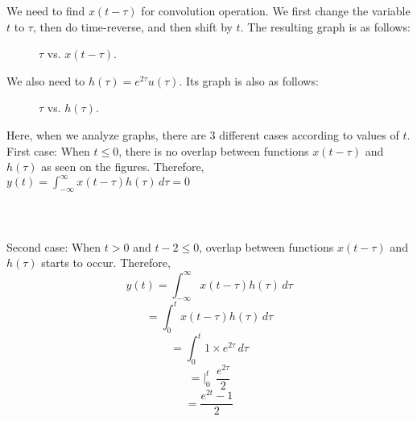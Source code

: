 \documentclass[10pt,a4paper, margin=1in]{article}
\begin{document}
\begin{enumerate}
\begin{enumerate}
    We need to find $x(t-\tau)$ for convolution operation. We first change the variable $t$ to $\tau$, then do time-reverse, and then shift by $t$. The resulting graph is as follows: \\
    
    \begin{figure}[H]
    \centering
        \caption{$\tau$ vs. $x(t-\tau)$.}
        \label{fig:q4_2}
    \end{figure}
    
    We also need to $h(\tau) = e^{2\tau}u(\tau)$. Its graph is also as follows: \\
    
 \begin{figure}[H]
    \centering   
{}
\caption{$\tau$ vs. $h(\tau)$.}
        \label{fig:q4_3}
\end{figure}

Here, when we analyze graphs, there are 3 different cases according to values of $t$. \\
First case: When $t \leq 0$, there is no overlap between functions $x(t-\tau)$ and $h(\tau)$ as seen on the figures. Therefore, \\
$ y(t) =  \int_{- \infty}^{\infty} x(t-\tau)h(\tau) \,d\tau = 0 $ \\
\\
\\
\\
Second case: When $t>0$ and $t-2 \leq 0$, overlap between functions $x(t-\tau)$ and $h(\tau)$ starts to occur. Therefore, \\
 \[y(t) =  \int_{- \infty}^{\infty} x(t-\tau)h(\tau) \,d\tau   \]
 \[=  \int_{0}^{t} x(t-\tau)h(\tau) \,d\tau   \]
 \[=  \int_{0}^{t} 1 \times e^{2\tau} \,d\tau   \]
 \[=  |_0^t \ \ \frac{e^{2\tau}}{2}   \]
 \[=  \frac{e^{2t} - 1}{2}  \]
 

\end{enumerate}
\end{enumerate}
\end{document}

